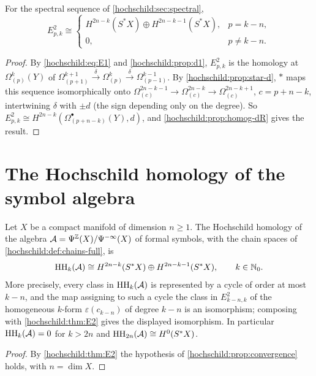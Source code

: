 \begin{theorem}\label{hochschild:thm:E2}
For the spectral sequence of \cref{hochschild:sec:spectral},
\begin{equation*}
  E^2_{p,k}\cong\begin{cases}H^{2n-k}(S^*X)\oplus H^{2n-k-1}(S^*X),&p=k-n,\\
  0,&p\ne k-n .\end{cases}
\end{equation*}
\end{theorem}
\begin{proof}
By \eqref{hochschild:eq:E1} and \cref{hochschild:prop:d1}, $E^2_{p,k}$ is the
homology at $\Omega^k_{(p)}(Y)$ of
$\Omega^{k+1}_{(p+1)}\xrightarrow{\delta}\Omega^k_{(p)}\xrightarrow{\delta}\Omega^{k-1}_{(p-1)}$.
By \cref{hochschild:prop:star-d}, $*$ maps this sequence isomorphically onto
$\Omega^{2n-k-1}_{(c)}\to\Omega^{2n-k}_{(c)}\to\Omega^{2n-k+1}_{(c)}$,
$c=p+n-k$, intertwining $\delta$ with $\pm d$ (the sign depending only on the
degree). So $E^2_{p,k}\cong H^{2n-k}(\Omega^\bullet_{(p+n-k)}(Y),d)$, and
\cref{hochschild:prop:homog-dR} gives the result.
\end{proof}

\section{The Hochschild homology of the symbol algebra}\label{hochschild:sec:main}

\begin{theorem}\label{hochschild:thm:main}
Let $X$ be a compact manifold of dimension $n\ge1$. The Hochschild homology of
the algebra $\mathcal{A}=\Psi^{\mathbb{Z}}(X)/\Psi^{-\infty}(X)$ of formal symbols, with
the chain spaces of \cref{hochschild:def:chains-full}, is
\begin{equation*}
  \operatorname{HH}_k(\mathcal{A})\cong H^{2n-k}(S^*X)\oplus H^{2n-k-1}(S^*X),\qquad k\in\mathbb{N}_0 .
\end{equation*}
More precisely, every class in $\operatorname{HH}_k(\mathcal{A})$ is represented by a cycle of order
at most $k-n$, and the map assigning to such a cycle the class in
$E^2_{k-n,k}$ of the homogeneous $k$-form $\varepsilon(c_{k-n})$ of degree
$k-n$ is an isomorphism; composing with \cref{hochschild:thm:E2} gives the displayed
isomorphism. In particular $\operatorname{HH}_k(\mathcal{A})=0$ for $k>2n$ and
$\operatorname{HH}_{2n}(\mathcal{A})\cong H^0(S^*X)$.
\end{theorem}
\begin{proof}
By \cref{hochschild:thm:E2} the hypothesis of
\cref{hochschild:prop:convergence} holds, with $n=\dim X$.
\end{proof}

